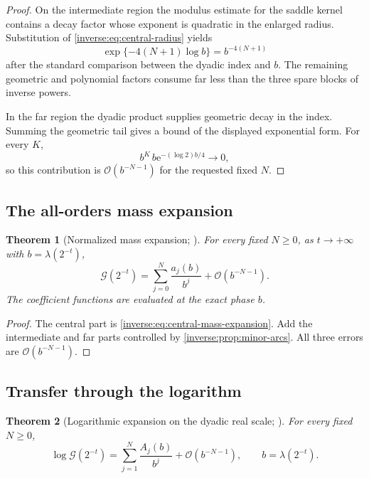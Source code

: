 \documentclass[11pt,oneside]{article}
\newtheorem{theorem}{Theorem}[section]
\theoremstyle{definition}
\theoremstyle{remark}
\newcommand{\e}{\mathrm e}
\newcommand{\bigO}{\mathcal O}
\begin{document}
\begin{proof}
On the intermediate region the modulus estimate for the saddle kernel
contains a decay factor whose exponent is quadratic in the enlarged
radius.  Substitution of \eqref{inverse:eq:central-radius} yields
\[
 \exp\{-4(N+1)\log b\}=b^{-4(N+1)}
\]
after the standard comparison between the dyadic index and $b$.  The
remaining geometric and polynomial factors consume far less than the
three spare blocks of inverse powers.

In the far region the dyadic product supplies geometric decay in the
index.  Summing the geometric tail gives a bound of the displayed
exponential form.  For every $K$,
\[
 b^K\,b\e^{-(\log2)b/4}\longrightarrow0,
\]
so this contribution is $\bigO(b^{-N-1})$ for the requested fixed $N$.
\end{proof}

\subsection{The all-orders mass expansion}

\begin{theorem}[Normalized mass expansion; \Formalized]
\label{inverse:thm:mass-all-orders}
For every fixed $N\geq0$, as $t\to+\infty$ with
$b=\lambda(2^{-t})$,
\begin{equation}
 \mathcal G(2^{-t})
 =\sum_{j=0}^{N}\frac{a_j(b)}{b^j}
  +\bigO(b^{-N-1}). \label{inverse:eq:mass-all-orders}
\end{equation}
The coefficient functions are evaluated at the exact phase $b$.
\end{theorem}

\begin{proof}
The central part is \eqref{inverse:eq:central-mass-expansion}.  Add the
intermediate and far parts controlled by \cref{inverse:prop:minor-arcs}.  All
three errors are $\bigO(b^{-N-1})$.
\end{proof}

\subsection{Transfer through the logarithm}

\begin{theorem}[Logarithmic expansion on the dyadic real scale;
\Formalized]
\label{inverse:thm:log-dyadic-all-orders}
For every fixed $N\geq0$,
\begin{equation}
 \log\mathcal G(2^{-t})
 =\sum_{j=1}^{N}\frac{A_j(b)}{b^j}
  +\bigO(b^{-N-1}),
 \qquad b=\lambda(2^{-t}). \label{inverse:eq:log-mass-all-orders}
\end{equation}
\end{theorem}
\end{document}
